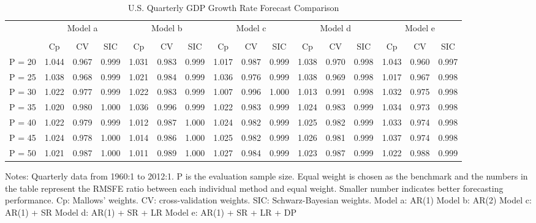 \begin{table}
    \caption{U.S. Quarterly GDP Growth Rate Forecast Comparison} \label{ntb:3}
    \centering
    \begin{adjustbox}{width=\textwidth,totalheight=\textheight,keepaspectratio}
    \begin{threeparttable}
    \begin{tabular}{lccccccccccccccc}
    \toprule
     & \multicolumn{3}{c}{Model a} & \multicolumn{3}{c}{Model b} & \multicolumn{3}{c}{Model c} & \multicolumn{3}{c}{Model d} & \multicolumn{3}{c}{Model e}\\%
    \cmidrule(r){2-4}
    \cmidrule(r){5-7}
    \cmidrule(r){8-10}
    \cmidrule(r){11-13}
    \cmidrule(r){14-16}\\
           & Cp    & CV    & SIC  & Cp    & CV    & SIC & Cp    & CV    & SIC & Cp    & CV    & SIC & Cp    & CV    & SIC \\
    P = 20 & 1.044 & 0.967 & 0.999& 1.031 & 0.983 &0.999& 1.017 & 0.987 &0.999& 1.038 & 0.970 &0.998& 1.043 & 0.960 &0.997 \\
    P = 25 & 1.038 & 0.968 & 0.999& 1.021 & 0.984 &0.999& 1.036 & 0.976 &0.999& 1.038 & 0.969 &0.998& 1.017 & 0.967 &0.998 \\
    P = 30 & 1.022 & 0.977 & 0.999& 1.022 & 0.983 &0.999& 1.007 & 0.996 &1.000& 1.013 & 0.991 &0.998& 1.032 & 0.975 &0.998 \\
    P = 35 & 1.020 & 0.980 & 1.000& 1.036 & 0.996 &0.999& 1.022 & 0.983 &0.999& 1.024 & 0.983 &0.999& 1.034 & 0.973 &0.998 \\
    P = 40 & 1.022 & 0.979 & 0.999& 1.012 & 0.987 &1.000& 1.024 & 0.982 &0.999& 1.025 & 0.982 &0.999& 1.033 & 0.974 &0.998 \\
    P = 45 & 1.024 & 0.978 & 1.000& 1.014 & 0.986 &1.000& 1.025 & 0.982 &0.999& 1.026 & 0.981 &0.999& 1.037 & 0.974 &0.998 \\
    P = 50 & 1.021 & 0.987 & 1.000& 1.011 & 0.989 &1.000& 1.027 & 0.984 &0.999& 1.023 & 0.987 &0.999& 1.022 & 0.988 &0.999 \\
    \bottomrule
    \end{tabular}
    \begin{tablenotes} \footnotesize
    Notes: Quarterly data from 1960:1 to 2012:1. $\mathrm{P}$ is the evaluation sample size. Equal weight is chosen as the benchmark and the numbers in the table represent the RMSFE ratio between each individual method and equal weight. Smaller number indicates better forecasting performance. Cp: Mallows' weights. CV: cross-validation weights. SIC: Schwarz-Bayesian weights.
    \newline Model a: AR(1)
    \newline Model b: AR(2)
    \newline Model c: AR(1) + SR
    \newline Model d: AR(1) + SR + LR
    \newline Model e: AR(1) + SR + LR + DP
    \end{tablenotes}
    \end{threeparttable}
    \end{adjustbox}
\end{table}
